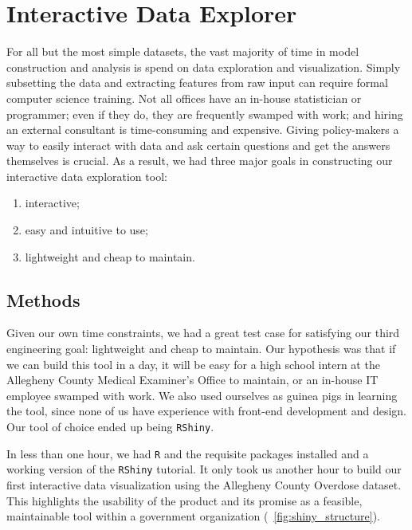 \documentclass{article}
\begin{document}
\section{Interactive Data Explorer}
For all but the most simple datasets, the vast majority of time in model construction and analysis is spend on data exploration and visualization. Simply subsetting the data and extracting features from raw input can require formal computer science training. Not all offices have an in-house statistician or programmer; even if they do, they are frequently swamped with work; and hiring an external consultant is time-consuming and expensive. Giving policy-makers a way to easily interact with data and ask certain questions and get the answers themselves is crucial. As a result, we had three major goals in constructing our interactive data exploration tool:
\begin{enumerate}
\item interactive;
\item easy and intuitive to use;
\item lightweight and cheap to maintain.
\end{enumerate}

\subsection{Methods}
Given our own time constraints, we had a great test case for satisfying our third engineering goal: lightweight and cheap to maintain. Our hypothesis was that if we can build this tool in a day, it will be easy for a high school intern at the Allegheny County Medical Examiner's Office to maintain, or an in-house IT employee swamped with work. We also used ourselves as guinea pigs in learning the tool, since none of us have experience with front-end development and design. Our tool of choice ended up being \texttt{RShiny}.

In less than one hour, we had \texttt{R} and the requisite packages installed and a working version of the \texttt{RShiny} tutorial. It only took us another hour to build our first interactive data visualization using the Allegheny County Overdose dataset. This highlights the usability of the product and its promise as a feasible, maintainable tool within a government organization (~\ref{fig:shiny_structure}).
\end{document}
